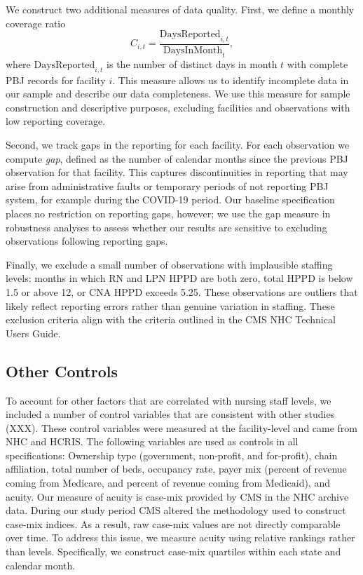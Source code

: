 \documentclass[preprint,authoryear]{elsarticle}
\begin{document}
We construct two additional measures of data quality. First, we define a monthly coverage ratio
\[
  C_{i,t} = \frac{\text{DaysReported}_{i,t}}{\text{DaysInMonth}_t},
\]
where $\text{DaysReported}_{i,t}$ is the number of distinct days in month $t$ with complete PBJ records for facility $i$. This measure allows us to identify incomplete data in our sample and describe our data completeness. We use this measure for sample construction and descriptive purposes, excluding facilities and observations with low reporting coverage.

Second, we track gaps in the reporting for each facility. For each observation we compute \textit{gap}, defined as the number of calendar months since the previous PBJ observation for that facility. This captures discontinuities in reporting that may arise from administrative faults or temporary periods of not reporting PBJ system, for example during the COVID-19 period. Our baseline specification places no restriction on reporting gaps, however; we use the gap measure in robustness analyses to assess whether our results are sensitive to excluding observations following reporting gaps.

Finally, we exclude a small number of observations with implausible staffing levels: months in which RN and LPN HPPD are both zero, total HPPD is below 1.5 or above 12, or CNA HPPD exceeds 5.25. These observations are outliers that likely reflect reporting errors rather than genuine variation in staffing. These exclusion criteria align with the criteria outlined in the CMS NHC Technical Users Guide.

\subsection{Other Controls}

To account for other factors that are correlated with nursing staff levels, we included a number of control variables that are consistent with other studies (XXX). These control variables were measured at the facility-level and came from NHC and HCRIS. The following variables are used as controls in all specifications: Ownership type (government, non-profit, and for-profit), chain affiliation, total number of beds, occupancy rate, payer mix (percent of revenue coming from Medicare, and percent of revenue coming from Medicaid), and acuity. Our measure of acuity is case-mix provided by CMS in the NHC archive data. During our study period CMS altered the methodology used to construct case-mix indices. As a result, raw case-mix values are not directly comparable over time. To address this issue, we measure acuity using relative rankings rather than levels. Specifically, we construct case-mix quartiles within each state and calendar month.
\end{document}
